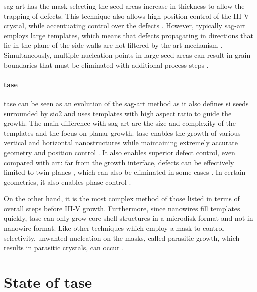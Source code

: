 \acs{sag}-\acs{art} has the mask selecting the seed areas increase in thickness to allow the trapping of defects. This technique also allows high position control of the III-V crystal, while accentuating control over the defects \cite{Han2016, Han2016_2}. However, typically \acs{sag}-\acs{art} employs large templates, which means that defects propagating in directions that lie in the plane of the side walls are not filtered by the \acs{art} mechanism \cite{Kunert2018}. Simultaneously, multiple nucleation points in large seed areas can result in grain boundaries that must be eliminated with additional process steps \cite{Kunert2016}.
\par
\paragraph{\Acf{tase}} \acs{tase} can be seen as an evolution of the \acs{sag}-\acs{art} method as it also defines \acl{si} seeds surrounded by \acs{sio2} and uses templates with high aspect ratio to guide the growth. The main difference with \acs{sag}-\acs{art} are the size and complexity of the templates and the focus on planar growth. \acs{tase} enables the growth of various vertical and horizontal nanostructures while maintaining extremely accurate geometry and position control \cite{Ritter2021, Tiwari2020, Schmid2015}. It also enables superior defect control, even compared with \acs{art}: far from the growth interface, defects can be effectively limited to twin planes \cite{Han2020}, which can also be eliminated in some cases \cite{Knoedler2017}. In certain geometries, it also enables phase control \cite{Staudinger2018}. 

On the other hand, it is the most complex method of those listed in terms of overall steps before III-V growth. Furthermore, since nanowires fill templates quickly, \acs{tase} can only grow core-shell structures in a microdisk format \cite{Tiwari2020} and not in nanowire format. Like other techniques which employ a mask to control selectivity, unwanted nucleation on the masks, called parasitic growth, which results in parasitic crystals, can occur \cite{Goswami2021}.
\par

\section{\texorpdfstring{State of \acl{tase}}{State of template assisted selective epitaxy}}

